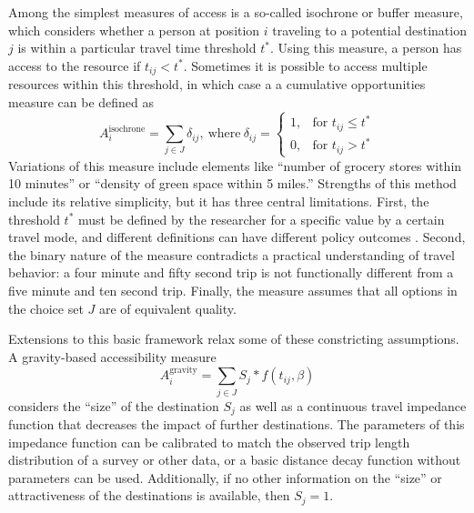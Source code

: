 \documentclass[ijerph,article,submit,moreauthors,pdftex]{mdpi}
\begin{document}
Among the simplest measures of access is a so-called isochrone or buffer measure, which
considers whether a person at position \(i\) traveling to a potential destination
\(j\) is within a particular travel time threshold \(t^*\). Using this measure, a
person has access to the resource if \(t_{ij} < t^*\). Sometimes it is
possible to access multiple resources within this threshold, in which case a
a cumulative opportunities measure can be defined as
\begin{equation}
  A_i^{\mathrm{isochrone}} = \sum_{j \in J} \delta_{ij}, 
  \mathrm{\ where\ } \delta_{ij} = 
  \begin{cases}
    1, & \text{for } t_{ij} \leq t^*\\
    0, & \text{for } t_{ij} > t^*
  \end{cases} 
  \label{eq:isochrone}
\end{equation}
Variations of this measure include elements like ``number of grocery stores
within 10 minutes'' or ``density of green space within 5 miles.'' Strengths of
this method include its relative simplicity, but it has three central limitations. First,
the threshold \(t^*\) must be defined by the researcher for a specific value by
a certain travel mode, and different definitions
can have different policy outcomes \citep{logan2019}. Second, the binary nature of the
measure contradicts a practical understanding of travel behavior: a four minute and fifty second
trip is not functionally different from a five minute and ten second trip. Finally,
the measure assumes that all options in the choice set \(J\) are of equivalent
quality.

Extensions to this basic framework relax some of these constricting assumptions.
A gravity-based accessibility measure
\begin{equation}
  A_i^{\mathrm{gravity}} = \sum_{j \in J} S_j * f(t_{ij}, \beta)
  \label{eq:gravity}
\end{equation}
considers the ``size'' of the destination \(S_j\) as well as a continuous travel
impedance function that decreases the impact of further destinations. The parameters
of this impedance function can be calibrated to match the observed trip length
distribution of a survey or other data, or a basic distance decay function without
parameters can be used. Additionally, if no other information on the ``size'' or
attractiveness of the destinations is available, then \(S_j = 1\).
\end{document}
